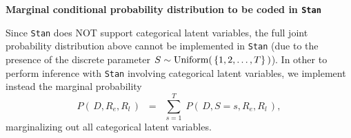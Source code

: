 \vskip 1.0cm
\noindent
\begin{center}
\textbf{\large Marginal conditional probability distribution to be coded in \texttt{Stan}}
\end{center}
\vskip 0.3cm
\noindent
Since \texttt{Stan} does NOT support categorical latent variables,
the full joint probability distribution above cannot be implemented in \texttt{Stan}
(due to the presence of the discrete parameter $S \sim \textnormal{Uniform}\!\left(\,\{1,2,\ldots,T\}\,\right)$).
In other to perform inference with \texttt{Stan} involving categorical latent variables,
we implement instead the {\color{red}marginal probability}
\begin{equation*}
P\!\left(\,D,R_{e},R_{l}\,\right)
\;\; = \;\;
	\overset{T}{\underset{s=1}{\sum}}\;
	P\!\left(\,D,S=s,R_{e},R_{l}\,\right),
\end{equation*}
marginalizing out all categorical latent variables.

